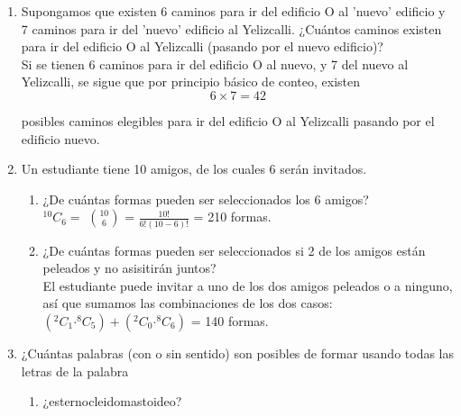 \documentclass[12pt,a4paper]{report}
\newcommand*{\Comb}[2]{{}^{#1}C_{#2}}
\begin{document}
\begin{enumerate}
   \item {
   Supongamos que existen 6 caminos para ir del edificio O al ’nuevo’
   edificio y 7 caminos para ir del ’nuevo’ edificio al Yelizcalli.
   ¿Cuántos caminos existen para ir del edificio O al Yelizcalli
   (pasando por el nuevo edificio)?\\

	Si se tienen 6 caminos para ir del edificio O al nuevo, y 7 del nuevo al
	Yelizcalli, se sigue que por principio básico de conteo, existen
		$$ 6 \times 7 = 42$$

	posibles caminos elegibles para ir del edificio O al Yelizcalli pasando por
	el edificio nuevo.
	}

   \item {
    Un estudiante tiene 10 amigos, de los cuales 6 serán invitados.\\
		\begin{enumerate}[label=\alph*) ]
		\item{
		¿De cuántas formas pueden ser seleccionados los 6 amigos?\\

		$\Comb{10}{6} =$ $10 \choose 6 $ = $\frac{10!}{6!(10-6)!}$ = 210 formas.\\
		}

		\item{
        ¿De cuántas formas pueden ser seleccionados si 2 de los amigos están
        peleados y no asisitirán juntos?\\

        El estudiante puede invitar a uno de los dos amigos peleados o a ninguno, así que sumamos las combinaciones de los dos casos: \\

         $(\Comb{2}{1} \boldsymbol{\cdot} \Comb{8}{5}) +(\Comb{2}{0} \boldsymbol{\cdot} \Comb{8}{6})$ = 140 formas.\\
		}
	\end{enumerate}
	}


   \item {
    ¿Cuántas palabras (con o sin sentido) son posibles de formar usando todas
    las letras de la palabra\\

	\begin{enumerate}[label=\alph*) ]
   \item {
	¿esternocleidomastoideo?\\
	
}
\end{enumerate}}
\end{enumerate}
\end{document}
